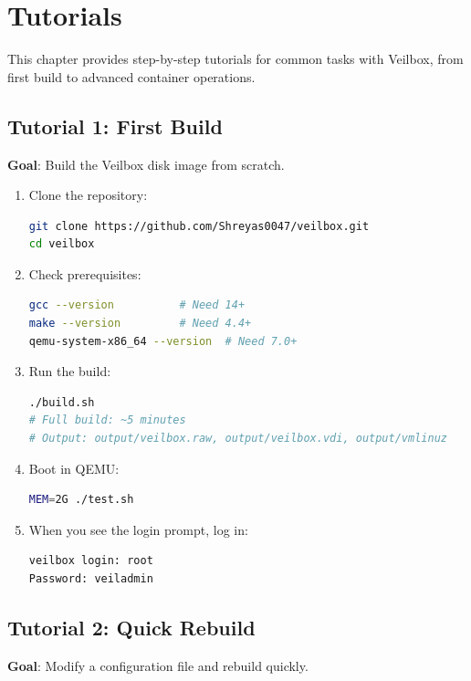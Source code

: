 \chapter{Tutorials}
\label{ch:tutorials}

This chapter provides step-by-step tutorials for common tasks with
Veilbox, from first build to advanced container operations.

\section{Tutorial 1: First Build}

\textbf{Goal}: Build the Veilbox disk image from scratch.

\begin{enumerate}[nosep]
  \item Clone the repository:
\begin{lstlisting}[language=bash]
git clone https://github.com/Shreyas0047/veilbox.git
cd veilbox
\end{lstlisting}
  \item Check prerequisites:
\begin{lstlisting}[language=bash]
gcc --version          # Need 14+
make --version         # Need 4.4+
qemu-system-x86_64 --version  # Need 7.0+
\end{lstlisting}
  \item Run the build:
\begin{lstlisting}[language=bash]
./build.sh
# Full build: ~5 minutes
# Output: output/veilbox.raw, output/veilbox.vdi, output/vmlinuz
\end{lstlisting}
  \item Boot in QEMU:
\begin{lstlisting}[language=bash]
MEM=2G ./test.sh
\end{lstlisting}
  \item When you see the login prompt, log in:
\begin{lstlisting}
veilbox login: root
Password: veiladmin
\end{lstlisting}
\end{enumerate}

\section{Tutorial 2: Quick Rebuild}

\textbf{Goal}: Modify a configuration file and rebuild quickly.

